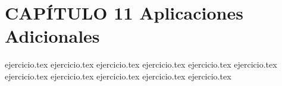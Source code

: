 
\section*{CAPÍTULO 11 \quad Aplicaciones Adicionales}

\begin{enumerate}
    {ejercicio.tex}
{ejercicio.tex}
{ejercicio.tex}
{ejercicio.tex}
{ejercicio.tex}
{ejercicio.tex}
{ejercicio.tex}
{ejercicio.tex}
{ejercicio.tex}
{ejercicio.tex}
{ejercicio.tex}
\end{enumerate}
